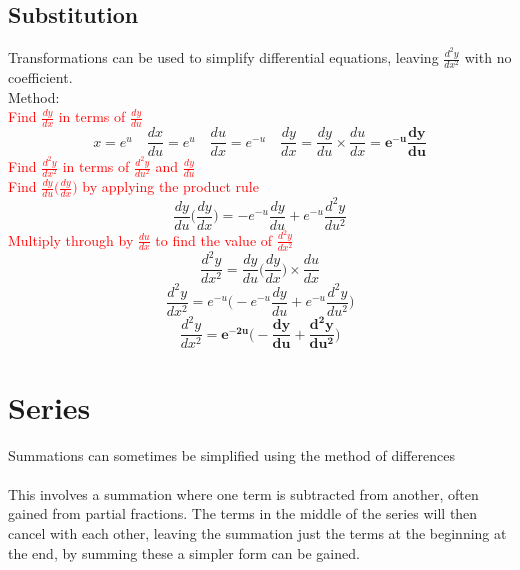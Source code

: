 \documentclass{article}[18pt]
\begin{document}
\subsection{Substitution}
Transformations can be used to simplify differential equations, leaving $\frac{d^2y}{dx^2}$ with no coefficient.\\
Method:\\
\textcolor{red}{\large Find $\frac{dy}{dx}$ in terms of $\frac{dy}{du}$}
$$x=e^u \quad \frac{dx}{du}=e^u \quad \frac{du}{dx}=e^{-u} \quad 
\frac{dy}{dx}=\frac{dy}{du}\times\frac{du}{dx}=\mathbf{e^{-u}\frac{dy}{du}}
$$
\textcolor{red}{\large Find $\frac{d^2y}{dx^2}$ in terms of $\frac{d^2y}{du^2}$ and $\frac{dy}{du}$}\\
\textcolor{red}{Find $\frac{dy}{du}\Big(\frac{dy}{dx}\Big)$ by applying the product rule}
$$\frac{dy}{du}\Big(\frac{dy}{dx}\Big)=-e^{-u}\frac{dy}{du}+e^{-u}\frac{d^2y}{du^2}$$
\textcolor{red}{Multiply through by $\frac{du}{dx}$ to find the value of $\frac{d^2y}{dx^2}$}
$$\frac{d^2y}{dx^2}=\frac{dy}{du}\Big(\frac{dy}{dx}\Big)\times\frac{du}{dx}$$
$$\frac{d^2y}{dx^2}=e^{-u}\Big(-e^{-u}\frac{dy}{du}+e^{-u}\frac{d^2y}{du^2}\Big)$$
$$\frac{d^2y}{dx^2}=\mathbf{e^{-2u}\Big(-\frac{dy}{du}+\frac{d^2y}{du^2}\Big)}$$
\section{Series}
Summations can sometimes be simplified using the method of differences\\
\\
This involves a summation where one term is subtracted from another, often gained from partial fractions. The terms in the middle of the series will then cancel with each other, leaving the summation just the terms at the beginning at the end, by summing these a simpler form can be gained.
\end{document}
